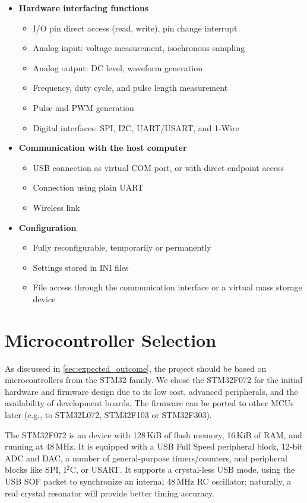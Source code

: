 \begin{itemize}
	\item \textbf{Hardware interfacing functions}
		\begin{itemize}
			\item I/O pin direct access (read, write), pin change interrupt
			\item Analog input: voltage measurement, isochronous sampling
			\item Analog output: DC level, waveform generation
			\item Frequency, duty cycle, and pulse length measurement
			\item Pulse and \gls{PWM} generation
			\item Digital interfaces: \gls{SPI}, \gls{I2C}, \gls{UART}/\gls{USART}, and 1-Wire
		\end{itemize}
	\pagebreak[0]
	\item \textbf{Communication with the host computer}
		\begin{itemize}
			\item \gls{USB} connection as virtual COM port, or with direct endpoint access
			\item Connection using plain \gls{UART}
			\item Wireless link
		\end{itemize}
	\item \textbf{Configuration}
		\begin{itemize}
			\item Fully reconfigurable, temporarily or permanently
			\item Settings stored in INI files
			\item File access through the communication interface or a virtual mass storage device
		\end{itemize}
\end{itemize}

\section{Microcontroller Selection}

As discussed in \cref{sec:expected_outcome}, the project should be based on microcontrollers from the STM32 family. We chose the STM32F072 for the initial hardware and firmware design due to its low cost, advanced peripherals, and the availability of development boards. The firmware can be ported to other \glspl{MCU} later (e.g., to STM32L072, STM32F103 or STM32F303).

The STM32F072 is an \armcm device with 128\,KiB of flash memory, 16\,KiB of \gls{RAM}, and running at 48\,MHz. It is equipped with a \gls{USB} Full Speed peripheral block, 12-bit \gls{ADC} and \gls{DAC}, a number of general-purpose timers/counters, and peripheral blocks like SPI, I$^2$C, or USART. It supports a crystal-less \gls{USB} mode, using the \gls{USB} SOF packet to synchronize an internal 48\,MHz RC oscillator; naturally, a real crystal resonator will provide better timing accuracy.

